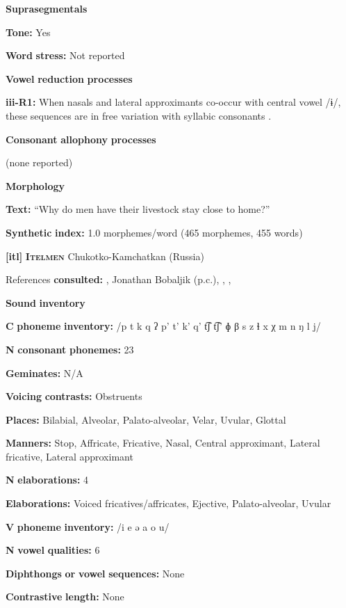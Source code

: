 \textbf{Suprasegmentals}

\textbf{Tone:} Yes

\textbf{Word} \textbf{stress:} Not reported

\textbf{Vowel} \textbf{reduction} \textbf{processes}

\textbf{iii-R1:} When nasals and lateral approximants co-occur with central vowel /ɨ/, these sequences are in free variation with syllabic consonants \citep[31]{Gerner2013}.

\textbf{Consonant} \textbf{allophony} \textbf{processes}

(none reported)

\textbf{Morphology}

\textbf{Text:} “Why do men have their livestock stay close to home?” \citep[525-530]{Gerner2013}

\textbf{Synthetic} \textbf{index:} 1.0 morphemes/word (465 morphemes, 455 words)

\textbf{[itl]}   \textbf{\textsc{Itelmen}}  Chukotko-Kamchatkan (Russia)

References \textbf{consulted:} \citet{Bobaljik2006}, Jonathan Bobaljik (p.c.), \citet{GeorgVolodin1999}, \citet{Volodin1976}, \citet{VolodinZhukova1968}

\textbf{Sound} \textbf{inventory}

\textbf{C} \textbf{phoneme} \textbf{inventory:} /p t k q ʔ p’ t’ k’ q’ t͡ʃ t͡ʃ’ ɸ β s z ɬ x χ m n ŋ l j/

\textbf{N} \textbf{consonant} \textbf{phonemes:} 23

\textbf{Geminates:} N/A

\textbf{Voicing} \textbf{contrasts:} Obstruents

\textbf{Places:} Bilabial, Alveolar, Palato-alveolar, Velar, Uvular, Glottal

\textbf{Manners:} Stop, Affricate, Fricative, Nasal, Central approximant, Lateral fricative, Lateral approximant

\textbf{N} \textbf{elaborations:} 4

\textbf{Elaborations:} Voiced fricatives/affricates, Ejective, Palato-alveolar, Uvular

\textbf{V} \textbf{phoneme} \textbf{inventory:} /i e ə a o u/

\textbf{N} \textbf{vowel} \textbf{qualities:} 6

\textbf{Diphthongs} \textbf{or} \textbf{vowel} \textbf{sequences:} None

\textbf{Contrastive} \textbf{length:} None

